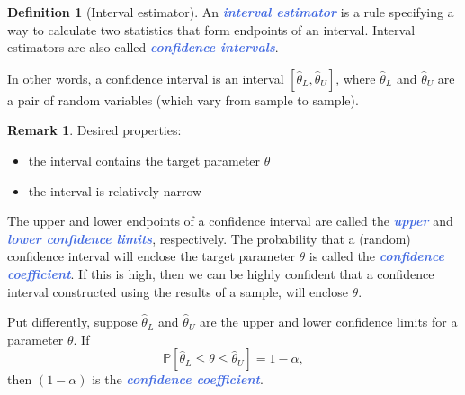 \documentclass[10pt]{article}
\theoremstyle{definition}
\newtheorem{definition}[theorem]{Definition}
\newtheorem{remark}[theorem]{Remark}
\newcommand{\1}[1]{\textbf{1}_{\left[#1\right]}} %
\def\P{\mathbb{P}} %
\newcommand{\demph}[1]{\textcolor{RoyalBlue}{\textbf{\slshape #1}}} %
\begin{document}
\begin{definition}[Interval estimator]
  \label{def:interval-estimator}
  An \demph{interval estimator} is a rule specifying a way to calculate two
  statistics that form endpoints of an interval. Interval estimators are also
  called \demph{confidence intervals}.
\end{definition}
In other words, a confidence interval is an interval
$[\widehat{\theta}_{L},\widehat{\theta}_{U}]$, where $\widehat{\theta}_{L}$
and $\widehat{\theta}_{U}$ are a pair of random variables (which vary from
sample to sample).
\begin{remark}
  Desired properties:
  \begin{itemize}
    \item the interval contains the target parameter $\theta$ 
    \item the interval is relatively narrow
  \end{itemize}
\end{remark}


The upper and lower endpoints of a confidence interval are called the
\demph{upper} and \demph{lower confidence limits}, respectively. The
probability that a (random) confidence interval will enclose the target
parameter $\theta$ is called the \demph{confidence coefficient}. If this is
high, then we can be highly confident that a confidence interval constructed
using the results of a sample, will enclose $\theta$.

Put differently, suppose $\widehat{\theta}_{L}$ and $\widehat{\theta}_{U}$ are
the upper and lower confidence limits for a parameter $\theta$. If
\begin{equation*}
  \P\left[\widehat{\theta}_{L}\leq \theta \leq \widehat{\theta}_{U}\right] = 1-\alpha,
\end{equation*}
then $(1-\alpha)$ is the \demph{confidence coefficient}.
\end{document}
